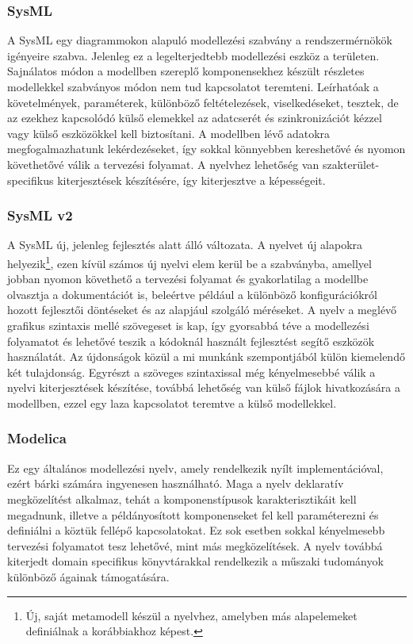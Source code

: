         \subsubsection{SysML}
        A SysML egy diagrammokon alapuló modellezési szabvány a rendszermérnökök igényeire szabva.
        Jelenleg ez a legelterjedtebb modellezési eszköz a területen. Sajnálatos módon a modellben szereplő
        komponensekhez készült részletes modellekkel szabványos módon nem tud kapcsolatot teremteni.
        Leírhatóak a követelmények, paraméterek, különböző feltételezések, viselkedéseket, tesztek, de az
        ezekhez kapcsolódó külső elemekkel az adatcserét és szinkronizációt kézzel vagy külső eszközökkel
        kell biztosítani. A modellben lévő adatokra megfogalmazhatunk lekérdezéseket, így sokkal
        könnyebben kereshetővé és nyomon követhetővé válik a tervezési folyamat. A nyelvhez lehetőség van
        szakterület-specifikus kiterjesztések készítésére, így kiterjesztve a képességeit.

        \subsubsection{SysML v2}
        A SysML új, jelenleg fejlesztés alatt álló változata. A nyelvet új alapokra helyezik\footnote{Új, saját metamodell készül a nyelvhez, amelyben más alapelemeket definiálnak a korábbiakhoz képest.},
        ezen kívül számos új nyelvi elem kerül be a szabványba, amellyel jobban nyomon követhető a tervezési folyamat és
        gyakorlatilag a modellbe olvasztja a dokumentációt is, beleértve például a különböző konfigurációkról
        hozott fejlesztői döntéseket és az alapjául szolgáló méréseket. A nyelv a meglévő grafikus szintaxis
        mellé szövegeset is kap, így gyorsabbá téve a modellezési folyamatot és lehetővé teszik a kódoknál
        használt fejlesztést segítő eszközök használatát. Az újdonságok közül a mi munkánk szempontjából
        külön kiemelendő két tulajdonság. Egyrészt a szöveges szintaxissal még kényelmesebbé válik a nyelvi
        kiterjesztések készítése, továbbá lehetőség van külső fájlok hivatkozására a modellben, ezzel egy laza
        kapcsolatot teremtve a külső modellekkel.

        \subsubsection{Modelica}
        Ez egy általános modellezési nyelv, amely rendelkezik nyílt implementációval, ezért bárki számára
        ingyenesen használható. Maga a nyelv deklaratív megközelítést alkalmaz, tehát a komponenstípusok
        karakterisztikáit kell megadnunk, illetve a példányosított komponenseket fel kell paraméterezni és
        definiálni a köztük fellépő kapcsolatokat. Ez sok esetben sokkal kényelmesebb tervezési folyamatot
        tesz lehetővé, mint más megközelítések. A nyelv továbbá kiterjedt domain specifikus könyvtárakkal
        rendelkezik a műszaki tudományok különböző ágainak támogatására.

